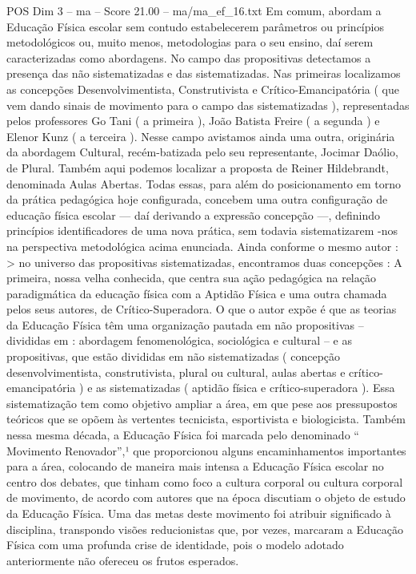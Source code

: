 \begin{textsample}{POS Dim 3 – ma – Score 21.00 – ma/ma\_ef\_16.txt}
Em comum, abordam a Educação Física escolar sem contudo estabelecerem parâmetros ou princípios metodológicos ou, muito menos, metodologias para o seu ensino, daí serem caracterizadas como abordagens.
No campo das propositivas detectamos a presença das não sistematizadas e das sistematizadas.
Nas primeiras localizamos as concepções Desenvolvimentista, Construtivista e Crítico-Emancipatória ( que vem dando sinais de movimento para o campo das sistematizadas ), representadas pelos professores Go Tani ( a primeira ), João Batista Freire ( a segunda ) e Elenor Kunz ( a terceira ).
Nesse campo avistamos ainda uma outra, originária da abordagem Cultural, recém-batizada pelo seu representante, Jocimar Daólio, de Plural.
Também aqui podemos localizar a proposta de Reiner Hildebrandt, denominada Aulas Abertas.
Todas essas, para além do posicionamento em torno da prática pedagógica hoje configurada, concebem uma outra configuração de educação física escolar — daí derivando a expressão concepção —, definindo princípios identificadores de uma nova prática, sem todavia sistematizarem -nos na perspectiva metodológica acima enunciada.
Ainda conforme o mesmo autor : > no universo das propositivas sistematizadas, encontramos duas concepções : A primeira, nossa velha conhecida, que centra sua ação pedagógica na relação paradigmática da educação física com a Aptidão Física e uma outra chamada pelos seus autores, de Crítico-Superadora.
O que o autor expõe é que as teorias da Educação Física têm uma organização pautada em não propositivas – divididas em : abordagem fenomenológica, sociológica e cultural – e as propositivas, que estão divididas em não sistematizadas ( concepção desenvolvimentista, construtivista, plural ou cultural, aulas abertas e crítico-emancipatória ) e as sistematizadas ( aptidão física e crítico-superadora ).
Essa sistematização tem como objetivo ampliar a área, em que pese aos pressupostos teóricos que se opõem às vertentes tecnicista, esportivista e biologicista.
Também nessa mesma década, a Educação Física foi marcada pelo denominado “ Movimento Renovador”,¹ que proporcionou alguns encaminhamentos importantes para a área, colocando de maneira mais intensa a Educação Física escolar no centro dos debates, que tinham como foco a cultura corporal ou cultura corporal de movimento, de acordo com autores que na época discutiam o objeto de estudo da Educação Física.
Uma das metas deste movimento foi atribuir significado à disciplina, transpondo visões reducionistas que, por vezes, marcaram a Educação Física com uma profunda crise de identidade, pois o modelo adotado anteriormente não ofereceu os frutos esperados.

\end{textsample}
